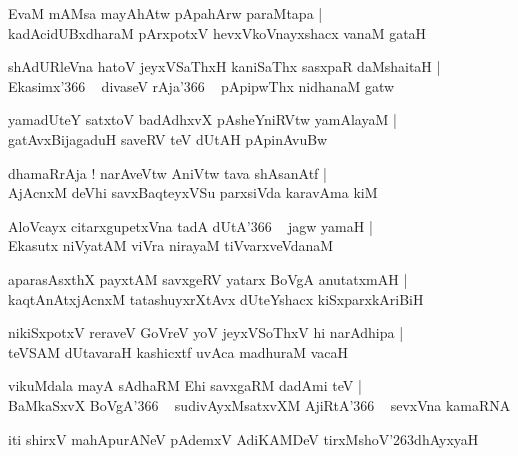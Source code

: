 \documentclass[twoside,12pt,openright]{book}
\def\S{\char'263}
\newcounter{shloka}[chapter]
\begin{document}
\begin{shloka}
EvaM mAMsa mayAhAtw pApahArw paraMtapa |\\
kadAcidUBxdharaM pArxpotxV hevxVkoVnayxshacx vanaM gataH 
\end{shloka}

\begin{shloka}
shAdURleVna hatoV jeyxVSaThxH kaniSaThx sasxpaR daMshaitaH |\\
Ekasimx\char'366 ~ divaseV rAja\char'366 ~ pApipwThx nidhanaM gatw
\end{shloka}

\begin{shloka}
yamadUteY satxtoV badAdhxvX pAsheYniRVtw yamAlayaM |\\
gatAvxBijagaduH saveRV teV dUtAH pApinAvuBw
\end{shloka}

\begin{shloka}
dhamaRrAja ! narAveVtw AniVtw tava shAsanAtf |\\
AjAcnxM deVhi savxBaqteyxVSu parxsiVda karavAma kiM 
\end{shloka}

\begin{shloka}
AloVcayx citarxgupetxVna tadA dUtA\char'366 ~ jagw yamaH |\\
Ekasutx niVyatAM viVra nirayaM tiVvarxveVdanaM 
\end{shloka}

\begin{shloka}
aparasAsxthX payxtAM savxgeRV yatarx BoVgA anutatxmAH |\\
kaqtAnAtxjAcnxM tatashuyxrXtAvx dUteYshacx kiSxparxkAriBiH 
\end{shloka}

\begin{shloka}
nikiSxpotxV reraveV GoVreV yoV jeyxVSoThxV hi narAdhipa |\\
teVSAM dUtavaraH kashicxtf uvAca madhuraM vacaH 
\end{shloka}

\begin{shloka}
vikuMdala mayA sAdhaRM Ehi savxgaRM dadAmi teV |\\
BaMkaSxvX BoVgA\char'366 ~ sudivAyxMsatxvXM AjiRtA\char'366 ~ sevxVna kamaRNA
\end{shloka}

\begin{center}
iti shirxV mahApurANeV pAdemxV AdiKAMDeV tirxMshoV\S dhAyxyaH 
\end{center}
\end{document}
